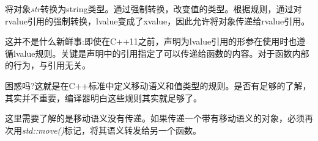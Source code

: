 将对象\textit{str}转换为string类型。通过强制转换，改变值的类型。根据规则，通过对rvalue引用的强制转换，lvalue变成了xvalue，因此允许将对象传递给rvalue引用。\par

这并不是什么新鲜事:即使在C++11之前，声明为lvalue引用的形参在使用时也遵循lvalue规则。关键是声明中的引用指定了可以传递给函数的内容。对于函数内部的行为，与引用无关。\par

困惑吗?这就是在C++标准中定义移动语义和值类型的规则。是否有足够的了解，其实并不重要，编译器明白这些规则其实就足够了。\par

这里需要了解的是移动语义没有传递。如果传递一个带有移动语义的对象，必须再次用\textit{std::move()}标记，将其语义转发给另一个函数。\par











































